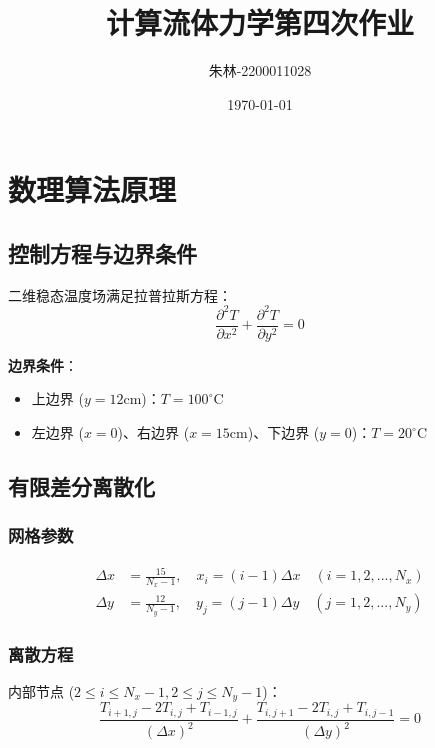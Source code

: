 \documentclass[UTF8]{ctexart}
\begin{document}
\title{计算流体力学第四次作业}
\author{朱林-2200011028}
\date{\today}
\maketitle


\section{数理算法原理}

\subsection{控制方程与边界条件}
二维稳态温度场满足拉普拉斯方程：
\begin{equation}
    \frac{\partial^2 T}{\partial x^2} + \frac{\partial^2 T}{\partial y^2} = 0
\end{equation}

\textbf{边界条件}：
\begin{itemize}
    \item 上边界 ($ y=12\text{cm} $)：$ T = 100^\circ \text{C} $ 
    \item 左边界 ($ x=0 $)、右边界 ($ x=15\text{cm} $)、下边界 ($ y=0 $)：$ T = 20^\circ \text{C} $
\end{itemize}

\subsection{有限差分离散化}
\subsubsection{网格参数}
\begin{align}
    \Delta x &= \frac{15}{N_x-1}, \quad x_i = (i-1)\Delta x \quad (i=1,2,...,N_x) \\
    \Delta y &= \frac{12}{N_y-1}, \quad y_j = (j-1)\Delta y \quad (j=1,2,...,N_y)
\end{align}

\subsubsection{离散方程}
内部节点 ($ 2 \leq i \leq N_x-1, 2 \leq j \leq N_y-1 $)：
\begin{equation}
    \frac{T_{i+1,j} - 2T_{i,j} + T_{i-1,j}}{(\Delta x)^2} + \frac{T_{i,j+1} - 2T_{i,j} + T_{i,j-1}}{(\Delta y)^2} = 0
\end{equation}
\end{document}
